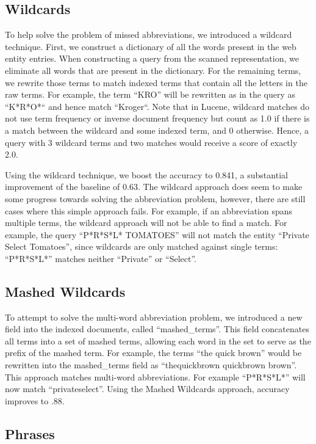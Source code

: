 \documentclass[11pt,a4paper]{article}
\begin{document}
\subsection{Wildcards}

To help solve the problem of missed abbreviations, we introduced a
wildcard technique.  First, we construct a dictionary of all the words
present in the web entity entries.  When constructing a query from the
scanned representation, we eliminate all words that are present in the
dictionary.  For the remaining terms, we rewrite those terms to match
indexed terms that contain all the letters in the raw terms.  For
example, the term ``KRO'' will be rewritten as in the query as
``K*R*O*`` and hence match ``Kroger``.  Note that in Lucene, wildcard
matches do not use term frequency or inverse document frequency but
count as 1.0 if there is a match between the wildcard and some indexed
term, and 0 otherwise.  Hence, a query with 3 wildcard terms and two
matches would receive a score of exactly 2.0.

Using the wildcard technique, we boost the accuracy to 0.841, a
substantial improvement of the baseline of 0.63.  The wildcard
approach does seem to make some progress towards solving the
abbreviation problem, however, there are still cases where this simple
approach fails.  For example, if an abbreviation spans multiple terms,
the wildcard approach will not be able to find a match.  For example,
the query ``P*R*S*L* TOMATOES'' will not match the entity ``Private
Select Tomatoes'', since wildcards are only matched against single
terms: ``P*R*S*L*'' matches neither ``Private'' or ``Select''.

\subsection{Mashed Wildcards}

To attempt to solve the multi-word abbreviation problem, we introduced
a new field into the indexed documents, called ``mashed\_terms''.  This
field concatenates all terms into a set of mashed
terms, allowing each word in the set to serve as the prefix of the
mashed term.  For example, the terms ``the quick brown'' would
be rewritten into the mashed\_terms field as ``thequickbrown quickbrown
brown''.  This approach matches multi-word abbreviations.  For example
``P*R*S*L*'' will now match ``privateselect''.  Using the Mashed
Wildcards approach, accuracy improves to .88. 

\subsection{Phrases}
\end{document}
